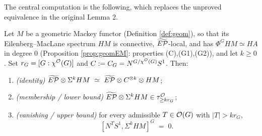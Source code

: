 The central computation is the following, which replaces the unproved equivalence
in the original Lemma 2.

\begin{qfivelemma}\label{lem:geom}
Let $M$ be a geometric Mackey functor (Definition \ref{def:geom}), so that its
Eilenberg--MacLane spectrum $HM$ is connective, $\widetilde{E\mathcal P}$-local, and has
$\Phi^G HM\simeq HA$ in degree $0$ (Proposition \ref{prop:geomEM}: properties
(C),(G1),(G2)), and let $k\ge 0$.
Set $r_G=[G:\chi^{\mathcal{O}}(G)]$ and $C:=C_G=N^{G/\chi^{\mathcal{O}}(G)}S^1$. Then:
\begin{enumerate}\setlength\itemsep{3pt}
\item \emph{(identity)} $\widetilde{E\mathcal P}\otimes\Sigma^k HM\ \simeq\ \widetilde{E\mathcal P}\otimes C^{\otimes k}\otimes HM$;
\item \emph{(membership / lower bound)} $\widetilde{E\mathcal P}\otimes\Sigma^k HM\in\tau^{\mathcal{O}}_{\ge k r_G}$;
\item \emph{(vanishing / upper bound)} for every admissible $T\in\mathcal{O}(G)$ with
$|T|>k r_G$,
\[
[N^T S^1,\Sigma^k HM]^G\;=\;0 .
\]
\end{enumerate}
\end{qfivelemma}

